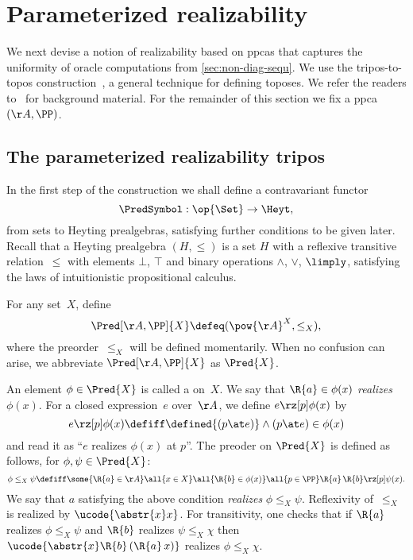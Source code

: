 \section{Parameterized realizability}
\label{sec:unif-real}

We next devise a notion of realizability based on ppcas that captures the uniformity of oracle computations from \cref{sec:non-diag-sequ}.
%
We use the tripos-to-topos construction~\cite{hyland80:_tripos}, a general technique for defining toposes. We refer the readers to~\cite[Sect.~S2.1]{oosten08:_realiz} for background material.
%
For the remainder of this section we fix a ppca $(\AA, \PP)$.

\subsection{The parameterized realizability tripos}
\label{sec:tripos-built-from}

In the first step of the construction we shall define a contravariant functor
%
\begin{equation*}
  \PredSymbol : \op{\Set} \to \Heyt,
\end{equation*}
%
from sets to Heyting prealgebras, satisfying further conditions to be given later.
%
Recall that a Heyting prealgebra $(H, {\leq})$ is a set $H$ with a reflexive transitive relation~$\leq$ with elements $\bot$, $\top$ and binary operations $\land$, $\lor$, $\limply$, satisfying the laws of intuitionistic propositional calculus.

For any set~$X$, define
%
\begin{equation*}
  \Pred[\AA,\PP]{X} \defeq (\pow{\AA}^X, {\leq_X}),
\end{equation*}
%
where the preorder~$\leq_X$ will be defined momentarily.
%
When no confusion can arise, we abbreviate $\Pred[\AA,\PP]{X}$ as $\Pred{X}$.

An element $\phi \in \Pred{X}$ is called a  on~$X$.
%
We say that $\R{a} \in \phi(x)$ \emph{realizes} $\phi(x)$.
%
For a closed expression~$e$ over~$\AA$, we define $e \rz[p] \phi(x)$ by
%
\begin{equation*}
  e \rz[p] \phi(x)
  \defiff
  \defined{(p \at e)} \land (p \at e) \in \phi(x)
\end{equation*}
%
and read it as ``$e$ realizes $\phi(x)$ at $p$''.
%
The preoder on $\Pred{X}$ is defined as follows, for $\phi, \psi \in \Pred{X}$:
%
\begin{equation*}
  \phi \leq_X \psi
  \defiff
    \some{\R{a} \in \AA}
    \all{x \in X}
    \all{\R{b} \in \phi(x)}
    \all{p \in \PP}
    \R{a} \, \R{b} \rz[p] \psi(x).
\end{equation*}
%
We say that $a$ satisfying the above condition \emph{realizes} $\phi \leq_X \psi$.
Reflexivity of~$\leq_X$ is realized by $\ucode{\abstr{x} x}$. For transitivity, one checks that if $\R{a}$ realizes $\phi \leq_X \psi$ and $\R{b}$ realizes $\psi \leq_X \chi$ then $\ucode{\abstr{x} \R{b} \, (\R{a} \, x)}$ realizes $\phi \leq_X \chi$.

